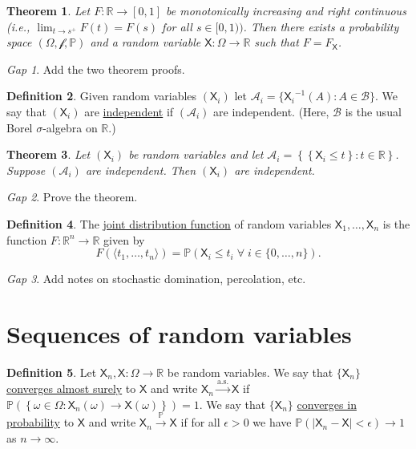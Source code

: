 \documentclass[11pt]{article}
\newcommand{\col}[1]{\mathscr{#1}}
\newcommand{\rv}[1]{\mathsf{#1}}
\newcommand{\p}{\mathbb{P}}
\newcommand{\bor}{\col{B}}
\newcommand{\defname}[1]{\underline{#1}}
\newcommand{\asto}{\xrightarrow{\text{a.s.}}}
\newcommand{\pto}{\xrightarrow{\p}}
\newcommand{\RR}{\mathbb{R}}
\theoremstyle{theorem}
\newtheorem{theorem}{Theorem}[section]
\theoremstyle{definition}
\newtheorem{definition}[theorem]{Definition}
\theoremstyle{remark}
\theoremstyle{step}
\theoremstyle{gap}
\newtheorem*{gap}{Gap}
\begin{document}
\begin{theorem}
Let \(F:\RR \to [0,1]\) be monotonically increasing and right continuous (i.e., \(\lim_{t\to s^+} F(t) = F(s)\) for all \(s \in [0,1))\). Then there exists a probability space \((\Omega, \col{f}, \p)\) and a random variable \(\rv{X}:\Omega \to \RR\) such that \(F = F_\rv{X}\).
\end{theorem}

\begin{gap}
Add the two theorem proofs.
\end{gap}

\begin{definition}
Given random variables \((\rv{X}_i)\) let \(\col{A}_i = \{{\rv{X}_i}^{-1}(A) : A \in \bor\}\). We say that \((\rv{X}_i)\) are \defname{independent} if \((\col{A}_i)\) are independent. (Here, \(\bor\) is the usual Borel \(\sigma\)-algebra on \(\RR\).)
\end{definition}

\begin{theorem}
Let \((\rv{X}_i)\) be random variables and let \(\col{A}_i = \left\{\left\{\rv{X}_i \leq t\right\} : t \in \RR\right\}\). Suppose \((\col{A}_i)\) are independent. Then \((\rv{X}_i)\) are independent.
\end{theorem}

\begin{gap}
Prove the theorem.
\end{gap}

\begin{definition}
The \defname{joint distribution function} of random variables \(\rv{X}_1, \ldots, \rv{X}_n\) is the function \(F:\RR^n \to \RR\) given by \[F\left(\langle t_1, \ldots, t_n\rangle\right) = \p \left(\rv{X}_i \leq t_i \;\forall\; i \in \{0, \ldots, n\}\right).\]
\end{definition}

\begin{gap}
Add notes on stochastic domination, percolation, etc.
\end{gap}

\section{Sequences of random variables}

\begin{definition}
Let \(\rv{X}_n, \rv{X} : \Omega\to \RR\) be random variables. We say that \(\{\rv{X}_n\}\) \defname{converges almost surely} to \(\rv{X}\) and write \(\rv{X}_n \asto \rv{X}\) if \(\p\left(\left\{\omega \in \Omega : \rv{X}_n(\omega) \to \rv{X}(\omega)\right\}\right) = 1\). We say that \(\{\rv{X}_n\}\) \defname{converges in probability} to \(\rv{X}\) and write \(\rv{X}_n \pto \rv{X}\) if for all \(\epsilon>0\) we have \(\p\left(\left|\rv{X}_n-\rv{X}\right| < \epsilon\right) \to 1\) as \(n \to \infty\).
\end{definition}
\end{document}
